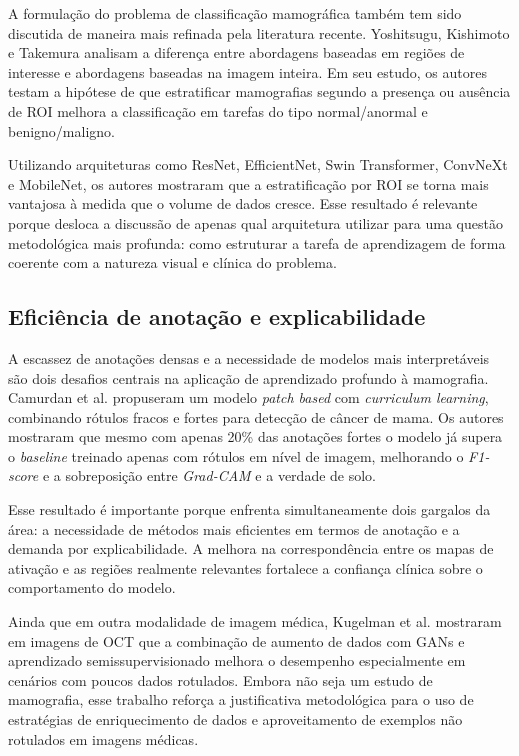 \documentclass[
    12pt,
    openright,
    oneside,
    a4paper,
    english,
    brazil
]{abntex2}
\begin{document}
A formulação do problema de classificação mamográfica também tem sido discutida de maneira mais refinada pela literatura recente. Yoshitsugu, Kishimoto e Takemura \cite{yoshitsugu2026} analisam a diferença entre abordagens baseadas em regiões de interesse e abordagens baseadas na imagem inteira. Em seu estudo, os autores testam a hipótese de que estratificar mamografias segundo a presença ou ausência de ROI melhora a classificação em tarefas do tipo normal/anormal e benigno/maligno.

Utilizando arquiteturas como ResNet, EfficientNet, Swin Transformer, ConvNeXt e MobileNet, os autores mostraram que a estratificação por ROI se torna mais vantajosa à medida que o volume de dados cresce. Esse resultado é relevante porque desloca a discussão de apenas qual arquitetura utilizar para uma questão metodológica mais profunda: como estruturar a tarefa de aprendizagem de forma coerente com a natureza visual e clínica do problema.

\subsection{Eficiência de anotação e explicabilidade}

A escassez de anotações densas e a necessidade de modelos mais interpretáveis são dois desafios centrais na aplicação de aprendizado profundo à mamografia. Camurdan et al. \cite{camurdan2025} propuseram um modelo \textit{patch based} com \textit{curriculum learning}, combinando rótulos fracos e fortes para detecção de câncer de mama. Os autores mostraram que mesmo com apenas 20\% das anotações fortes o modelo já supera o \textit{baseline} treinado apenas com rótulos em nível de imagem, melhorando o \textit{F1-score} e a sobreposição entre \textit{Grad-CAM} e a verdade de solo.

Esse resultado é importante porque enfrenta simultaneamente dois gargalos da área: a necessidade de métodos mais eficientes em termos de anotação e a demanda por explicabilidade. A melhora na correspondência entre os mapas de ativação e as regiões realmente relevantes fortalece a confiança clínica sobre o comportamento do modelo.

Ainda que em outra modalidade de imagem médica, Kugelman et al. \cite{kugelman2024} mostraram em imagens de OCT que a combinação de aumento de dados com GANs e aprendizado semissupervisionado melhora o desempenho especialmente em cenários com poucos dados rotulados. Embora não seja um estudo de mamografia, esse trabalho reforça a justificativa metodológica para o uso de estratégias de enriquecimento de dados e aproveitamento de exemplos não rotulados em imagens médicas.
\end{document}
